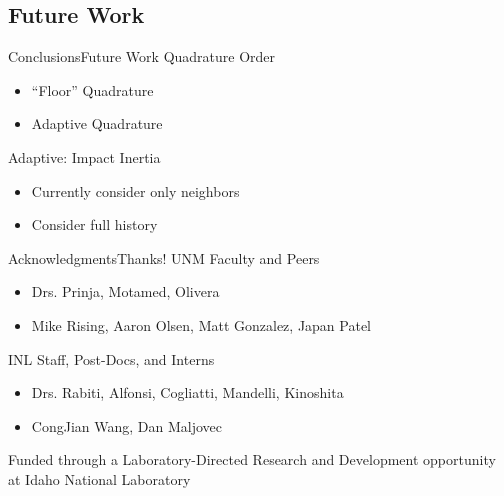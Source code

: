 \documentclass{beamer}
\begin{document}
\subsection{Future Work}
\begin{frame}{Conclusions}{Future Work}\vspace{-20pt}
  \vfill
    Quadrature Order
      \begin{itemize}
        \item ``Floor'' Quadrature
        \item Adaptive Quadrature
      \end{itemize}
  \vfill
    Adaptive: Impact Inertia
      \begin{itemize}
        \item Currently consider only neighbors
        \item Consider full history
      \end{itemize}
  \vfill
\end{frame}

\begin{frame}{Acknowledgments}{Thanks!}\vspace{-20pt}
  \vfill
  UNM Faculty and Peers
  \begin{itemize}
    \item Drs. Prinja, Motamed, Olivera
    \item Mike Rising, Aaron Olsen, Matt Gonzalez, Japan Patel
  \end{itemize}
  \vfill
  INL Staff, Post-Docs, and Interns
  \begin{itemize}
    \item Drs. Rabiti, Alfonsi, Cogliatti, Mandelli, Kinoshita
    \item CongJian Wang, Dan Maljovec
  \end{itemize}
  \vfill
  Funded through a Laboratory-Directed Research and Development opportunity at Idaho National Laboratory
\end{frame}
\end{document}
